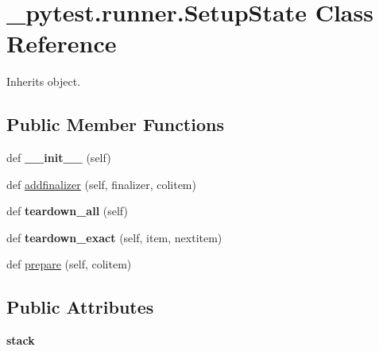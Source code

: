 \hypertarget{class__pytest_1_1runner_1_1_setup_state}{}\section{\+\_\+pytest.\+runner.\+Setup\+State Class Reference}
\label{class__pytest_1_1runner_1_1_setup_state}


Inherits object.

\subsection*{Public Member Functions}
\begin{DoxyCompactItemize}
\item 
\mbox{\label{class__pytest_1_1runner_1_1_setup_state_a0aed981e017d3f4df00e3766ab7fcd57}} 
def {\bfseries \+\_\+\+\_\+init\+\_\+\+\_\+} (self)
\item 
def \hyperlink{class__pytest_1_1runner_1_1_setup_state_aff0e87dd54e8ea40931e49a54dd95295}{addfinalizer} (self, finalizer, colitem)
\item 
\mbox{\label{class__pytest_1_1runner_1_1_setup_state_af7e0f1596858f057efafe094ab0d345b}} 
def {\bfseries teardown\+\_\+all} (self)
\item 
\mbox{\label{class__pytest_1_1runner_1_1_setup_state_a260918310cbd9621b7fd6a953f77407c}} 
def {\bfseries teardown\+\_\+exact} (self, item, nextitem)
\item 
def \hyperlink{class__pytest_1_1runner_1_1_setup_state_a1620131dc4ab5a7186039ac330acc846}{prepare} (self, colitem)
\end{DoxyCompactItemize}
\subsection*{Public Attributes}
\begin{DoxyCompactItemize}
\item 
\mbox{\label{class__pytest_1_1runner_1_1_setup_state_a8a12df156923e7d68a3a741d34eb30c6}} 
{\bfseries stack}
\end{DoxyCompactItemize}


